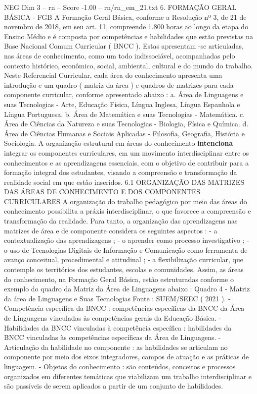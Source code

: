 \begin{textsample}{NEG Dim 3 – rn – Score -1.00 – rn/rn\_em\_21.txt}  \label{ex:f3_neg_191}
6.
FORMAÇÃO GERAL BÁSICA - FGB A Formação Geral Básica, conforme a Resolução nº 3, de 21 de novembro de 2018, em seu art. 11, compreende 1.800 horas ao longo da etapa do Ensino Médio e é composta por competências e habilidades que estão previstas na Base Nacional Comum Curricular ( BNCC ).
Estas apresentam -se articuladas, nas áreas de conhecimento, como um todo indissociável, acompanhadas pelo contexto histórico, econômico, social, ambiental, cultural e do mundo do trabalho.
Neste Referencial Curricular, cada área do conhecimento apresenta uma introdução e um quadro ( matriz da área ) e quadros de matrizes para cada componente curricular, conforme apresentado abaixo : a.
Área de Linguagens e suas Tecnologias - Arte, Educação Física, Língua Inglesa, Língua Espanhola e Língua Portuguesa. b.
Área de Matemática e suas Tecnologias - Matemática. c.
Área de Ciências da Natureza e suas Tecnologias - Biologia, Física e Química. d.
Área de Ciências Humanas e Sociais Aplicadas - Filosofia, Geografia, História e Sociologia.
A organização estrutural em áreas do conhecimento \textbf{intenciona} integrar os componentes curriculares, em um movimento interdisciplinar entre os conhecimentos e as aprendizagens essenciais, com o objetivo de contribuir para a formação integral dos estudantes, visando a compreensão e transformação da realidade social em que estão inseridos. 6.1 ORGANIZAÇÃO DAS MATRIZES DAS ÁREAS DE CONHECIMENTO E DOS COMPONENTES CURRICULARES A organização do trabalho pedagógico por meio das áreas do conhecimento possibilita a práxis interdisciplinar, o que favorece a compreensão e transformação da realidade.
Para tanto, a organização das aprendizagens nas matrizes de área e de componente considera os seguintes aspectos : - a contextualização das aprendizagens ; - o aprender como processo investigativo ; - o uso de Tecnologias Digitais de Informação e Comunicação como ferramenta de avanço conceitual, procedimental e atitudinal ; - a flexibilização curricular, que contemple os territórios dos estudantes, escolas e comunidades.
Assim, as áreas do conhecimento, na Formação Geral Básica, estão estruturadas conforme o exemplo do quadro da Matriz da Área de Linguagens abaixo : Quadro 4 - Matriz da área de Linguagens e Suas Tecnologias Fonte : SUEM/SEEC ( 2021 ). - Competência específica da BNCC : competências específicas da BNCC da Área de Linguagens vinculadas às competências gerais da Educação Básica. - Habilidades da BNCC vinculadas à competência específica : habilidades da BNCC vinculadas às competências específicas da Área de Linguagens. - Articulação da habilidade no componente : as habilidades se articulam no componente por meio dos eixos integradores, campos de atuação e as práticas de linguagem. - Objetos do conhecimento : são conteúdos, conceitos e processos organizados em diferentes temáticas que viabilizam um trabalho interdisciplinar e são passíveis de serem aplicados a partir de um conjunto de habilidades.

\end{textsample}
